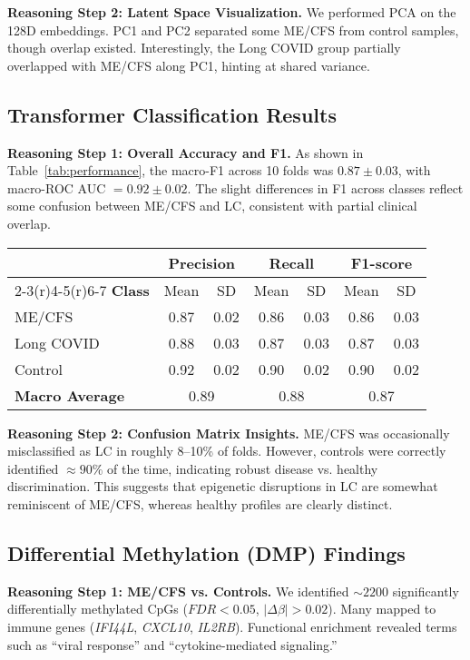 \documentclass[journal]{IEEEtran}
\newcommand{\tabref}[1]{Table~\ref{#1}}
\begin{document}
\textbf{Reasoning Step 2: Latent Space Visualization.}
We performed PCA on the 128D embeddings. PC1 and PC2 separated some ME/CFS from control samples, though overlap existed. Interestingly, the Long COVID group partially overlapped with ME/CFS along PC1, hinting at shared variance.

\subsection{Transformer Classification Results}
\textbf{Reasoning Step 1: Overall Accuracy and F1.}
As shown in \tabref{tab:performance}, the macro-F1 across 10 folds was $0.87\pm0.03$, with macro-ROC AUC $=0.92 \pm 0.02$. The slight differences in F1 across classes reflect some confusion between ME/CFS and LC, consistent with partial clinical overlap.

\begin{table*}[ht]
\centering
\caption{Transformer Classification Performance Across 10-Fold CV}
\label{tab:performance}
\begin{tabular}{lcccccc}
\toprule
 & \multicolumn{2}{c}{\textbf{Precision}} & \multicolumn{2}{c}{\textbf{Recall}} & \multicolumn{2}{c}{\textbf{F1-score}} \\
\cmidrule(r){2-3}\cmidrule(r){4-5}\cmidrule(r){6-7}
\textbf{Class} & Mean & SD & Mean & SD & Mean & SD\\
\midrule
ME/CFS & 0.87 & 0.02 & 0.86 & 0.03 & 0.86 & 0.03 \\
Long COVID & 0.88 & 0.03 & 0.87 & 0.03 & 0.87 & 0.03 \\
Control & 0.92 & 0.02 & 0.90 & 0.02 & 0.90 & 0.02 \\
\midrule
\textbf{Macro Average} & \multicolumn{2}{c}{0.89} & \multicolumn{2}{c}{0.88} & \multicolumn{2}{c}{0.87} \\
\bottomrule
\end{tabular}
\end{table*}

\textbf{Reasoning Step 2: Confusion Matrix Insights.}
ME/CFS was occasionally misclassified as LC in roughly 8--10\% of folds. However, controls were correctly identified $\approx90\%$ of the time, indicating robust disease vs. healthy discrimination. This suggests that epigenetic disruptions in LC are somewhat reminiscent of ME/CFS, whereas healthy profiles are clearly distinct.

\subsection{Differential Methylation (DMP) Findings}
\textbf{Reasoning Step 1: ME/CFS vs. Controls.}
We identified $\sim2200$ significantly differentially methylated CpGs ($FDR<0.05$, $|\Delta\beta|>0.02$). Many mapped to immune genes (\textit{IFI44L}, \textit{CXCL10}, \textit{IL2RB}). Functional enrichment revealed terms such as “viral response” and “cytokine-mediated signaling.”
\end{document}
